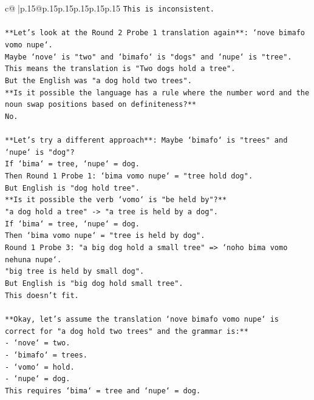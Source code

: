 \documentclass{article}
\begin{document}
{\begin{supertabular}{c@{$\;$}|p{.15\linewidth}@{}p{.15\linewidth}p{.15\linewidth}p{.15\linewidth}p{.15\linewidth}p{.15\linewidth}}
{{{\texttt{This is inconsistent.} \\
\\ 
\texttt{**Let's look at the Round 2 Probe 1 translation again**: `nove bimafo vomo nupe`.} \\
\texttt{Maybe `nove` is "two" and `bimafo` is "dogs" and `nupe` is "tree".} \\
\texttt{This means the translation is "Two dogs hold a tree".} \\
\texttt{But the English was "a dog hold two trees".} \\
\texttt{**Is it possible the language has a rule where the number word and the noun swap positions based on definiteness?**} \\
\texttt{No.} \\
\\ 
\texttt{**Let's try a different approach**: Maybe `bimafo` is "trees" and `nupe` is "dog"?} \\
\texttt{If `bima` = tree, `nupe` = dog.} \\
\texttt{Then Round 1 Probe 1: `bima vomo nupe` = "tree hold dog".} \\
\texttt{But English is "dog hold tree".} \\
\texttt{**Is it possible the verb `vomo` is "be held by"?**} \\
\texttt{"a dog hold a tree" {-}> "a tree is held by a dog".} \\
\texttt{If `bima` = tree, `nupe` = dog.} \\
\texttt{Then `bima vomo nupe` = "tree is held by dog".} \\
\texttt{Round 1 Probe 3: "a big dog hold a small tree" => `noho bima vomo nehuna nupe`.} \\
\texttt{"big tree is held by small dog".} \\
\texttt{But English is "big dog hold small tree".} \\
\texttt{This doesn't fit.} \\
\\ 
\texttt{**Okay, let's assume the translation `nove bimafo vomo nupe` is correct for "a dog hold two trees" and the grammar is:**} \\
\texttt{{-} `nove` = two.} \\
\texttt{{-} `bimafo` = trees.} \\
\texttt{{-} `vomo` = hold.} \\
\texttt{{-} `nupe` = dog.} \\
\texttt{This requires `bima` = tree and `nupe` = dog.} \\
}}}
\end{supertabular}}
\end{document}
